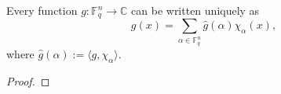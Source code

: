\begin{theorem}
\label{lem:fourier-expansion}
\leanok
Every function $g : \mathbb{F}_q^n \to \mathbb{C}$ can be
  written uniquely as
  \[
    g(x) = \sum_{\alpha \in \mathbb{F}_q^n} \widehat g(\alpha)\chi_\alpha(x),
  \]
  where $\widehat g(\alpha) := \langle g,\chi_\alpha\rangle$.
\end{theorem}
\begin{proof}
\end{proof}
